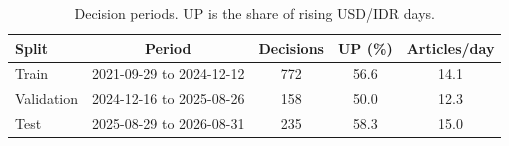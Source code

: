 \begin{table}[t]
    \caption{Decision periods. UP is the share of rising USD/IDR days.}
    \label{tab:splits}
    \centering
    \scriptsize
    \setlength{\tabcolsep}{3pt}
    \begin{tabular}{lcccc}
        \toprule
        Split & Period & Decisions & UP (\%) & Articles/day \\
        \midrule
        Train & 2021-09-29 to 2024-12-12 & 772 & 56.6 & 14.1 \\
        Validation & 2024-12-16 to 2025-08-26 & 158 & 50.0 & 12.3 \\
        Test & 2025-08-29 to 2026-08-31 & 235 & 58.3 & 15.0 \\
        \bottomrule
    \end{tabular}
\end{table}
